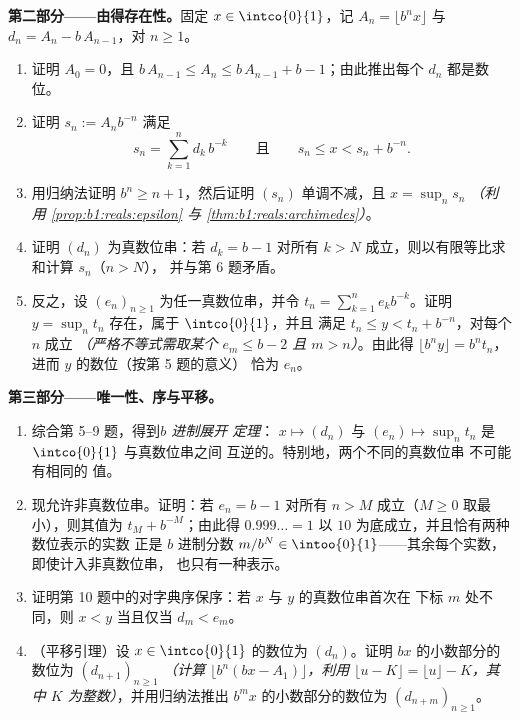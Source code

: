 \begin{problem}
\medskip
\noindent\textbf{第二部分——由得存在性。}固定
$x \in \intco{0}{1}$，记 $A_n = \lfloor b^n x \rfloor$ 与
$d_n = A_n - b\,A_{n-1}$，对 $n \geq 1$。
\begin{enumerate}[resume]
  \item 证明 $A_0 = 0$，且 $b\,A_{n-1} \leq A_n \leq b\,A_{n-1} +
        b - 1$；由此推出每个 $d_n$ 都是数位。
  \item 证明 $s_n := A_n b^{-n}$ 满足
        \[
        s_n = \sum_{k=1}^{n} d_k\,b^{-k}
        \qquad\text{且}\qquad
        s_n \leq x < s_n + b^{-n} .
        \]
  \item 用归纳法证明 $b^n \geq n + 1$，然后证明
        $(s_n)$ 单调不减，且 $x = \sup_n s_n$
        \emph{（利用 \cref{prop:b1:reals:epsilon} 与
        \cref{thm:b1:reals:archimedes}）}。
  \item 证明 $(d_n)$ 为真数位串：若 $d_k = b - 1$
        对所有 $k > N$ 成立，则以有限等比求和计算 $s_n$（$n > N$），
        并与第 6 题矛盾。
  \item 反之，设 $(e_n)_{n \geq 1}$ 为任一真数位串，并令
        $t_n = \sum_{k=1}^n e_k b^{-k}$。证明 $y
        = \sup_n t_n$ 存在，属于 $\intco{0}{1}$，并且
        满足 $t_n \leq y < t_n + b^{-n}$，对每个 $n$ 成立
        \emph{（严格不等式需取某个 $e_m \leq b
        - 2$ 且 $m > n$）}。由此得 $\lfloor b^n y \rfloor = b^n
        t_n$，进而 $y$ 的数位（按第 5 题的意义）
        恰为 $e_n$。
\end{enumerate}

\medskip
\noindent\textbf{第三部分——唯一性、序与平移。}
\begin{enumerate}[resume]
  \item 综合第 5--9 题，得到\emph{$b$ 进制展开
        定理}： $x \mapsto (d_n)$ 与 $(e_n) \mapsto
        \sup_n t_n$ 是 $\intco{0}{1}$ 与真数位串之间
        互逆的。特别地，两个不同的真数位串
        不可能有相同的
        值。
  \item 现允许非真数位串。证明：若 $e_n
        = b - 1$ 对所有 $n > M$ 成立（$M \geq 0$ 取最小），则其值为
        $t_M + b^{-M}$；由此得 $0.999\dots = 1$ 以
        $10$ 为底成立，并且恰有两种数位表示的实数
        正是 $b$ 进制分数
        $m/b^N \in \intoo{0}{1}$——其余每个实数，即使计入非真数位串，
        也只有一种表示。
  \item 证明第 10 题中的对字典序保序：若
        $x$ 与 $y$ 的真数位串首次在
        下标 $m$ 处不同，则
        $x < y$ 当且仅当 $d_m < e_m$。
  \item （平移引理）设 $x \in \intco{0}{1}$ 的数位为
        $(d_n)$。证明 $bx$ 的小数部分的数位为
        $(d_{n+1})_{n \geq 1}$ \emph{（计算 $\lfloor b^n(bx -
        A_1)\rfloor$，利用 $\lfloor u - K \rfloor = \lfloor u
        \rfloor - K$，其中 $K$ 为整数）}，并用归纳法推出
        $b^m x$ 的小数部分的数位为
        $(d_{n+m})_{n \geq 1}$。
\end{enumerate}


\end{problem}
